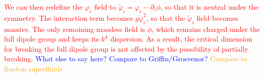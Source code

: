 \documentclass[pra,aps,twocolumn, amsfonts,amsmath,amssymb,nofootinbib,superscriptaddress]{revtex4-2}
\newcommand{\note}[1]{\textcolor{red}{#1}}
\newcommand{\todo}[1]{\textcolor{orange}{#1}}
\newcommand{\charlie}[1]{\textcolor{Blue}{#1}}
\renewcommand{\max}{\text{max}}
\begin{document}
\note{We can then redefine the $\varphi_i$ field to $\tilde{\varphi}_i = \varphi_i - \partial_i \phi$, so that it is neutral under the symmetry. The interaction term becomes $g\tilde{\varphi}_i^2$, so that the $\tilde{\varphi}_i$ field becomes massive. The only remaining massless field is $\phi$, which remains charged under the full dipole group and keeps its $k^4$ dispersion. As a result, the critical dimension for breaking the full dipole group is not affected by the possibility of partially breaking.
}
\charlie{What else to say here? Compare to Griffin/Grosvenor?}
\todo{Compare to fracton superfluids}



\end{document}
